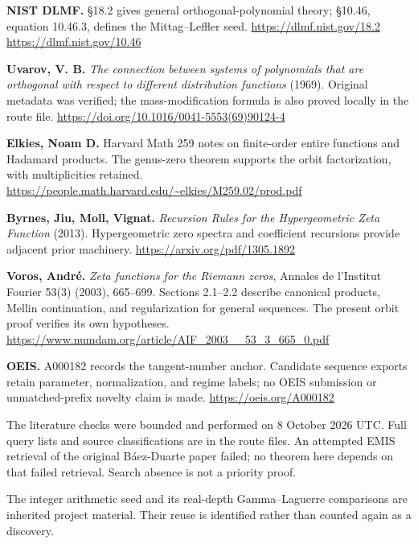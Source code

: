 \documentclass[11pt]{article}
\begin{document}
\textbf{NIST DLMF.} \S18.2 gives general orthogonal-polynomial theory;
\S10.46, equation 10.46.3, defines the Mittag--Leffler seed.
\url{https://dlmf.nist.gov/18.2}\quad
\url{https://dlmf.nist.gov/10.46}

\textbf{Uvarov, V. B.} \textit{The connection between systems of polynomials
that are orthogonal with respect to different distribution functions} (1969).
Original metadata was verified; the mass-modification formula is also proved
locally in the route file.
\url{https://doi.org/10.1016/0041-5553(69)90124-4}

\textbf{Elkies, Noam D.} Harvard Math 259 notes on finite-order entire
functions and Hadamard products. The genus-zero theorem supports the orbit
factorization, with multiplicities retained.
\url{https://people.math.harvard.edu/~elkies/M259.02/prod.pdf}

\textbf{Byrnes, Jiu, Moll, Vignat.} \textit{Recursion Rules for the
Hypergeometric Zeta Function} (2013). Hypergeometric zero spectra and
coefficient recursions provide adjacent prior machinery.
\url{https://arxiv.org/pdf/1305.1892}

\normalsize
\textbf{Voros, Andr\'e.} \textit{Zeta functions for the Riemann zeros},
Annales de l'Institut Fourier 53(3) (2003), 665--699. Sections 2.1--2.2
describe canonical products, Mellin continuation, and regularization for
general sequences. The present orbit proof verifies its own hypotheses.
\url{https://www.numdam.org/article/AIF_2003__53_3_665_0.pdf}

\textbf{OEIS.} A000182 records the tangent-number anchor. Candidate sequence
exports retain parameter, normalization, and regime labels; no OEIS submission
or unmatched-prefix novelty claim is made.
\url{https://oeis.org/A000182}

The literature checks were bounded and performed on 8 October 2026 UTC.
Full query lists and source classifications are in the route files. An
attempted EMIS retrieval of the original B\'aez-Duarte paper failed; no theorem
here depends on that failed retrieval. Search absence is not a priority proof.

The integer arithmetic seed and its real-depth Gamma--Laguerre comparisons
are inherited project material. Their reuse is identified rather than counted
again as a discovery.

\end{document}

